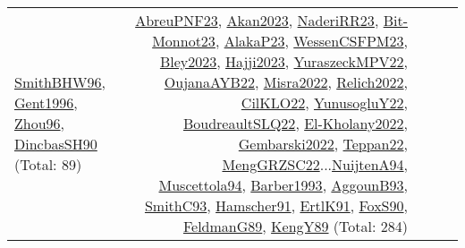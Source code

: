 {\begin{longtable}{p{3cm}r>{\raggedright\arraybackslash}p{6cm}>{\raggedright\arraybackslash}p{6cm}>{\raggedright\arraybackslash}p{8cm}}
\hyperref[detail:SmithBHW96]{SmithBHW96}, \hyperref[detail:Gent1996]{Gent1996}, \hyperref[detail:Zhou96]{Zhou96}, \hyperref[detail:DincbasSH90]{DincbasSH90} (Total: 89) & \hyperref[detail:AbreuPNF23]{AbreuPNF23}, \hyperref[detail:Akan2023]{Akan2023}, \hyperref[detail:NaderiRR23]{NaderiRR23}, \hyperref[detail:Bit-Monnot23]{Bit-Monnot23}, \hyperref[detail:AlakaP23]{AlakaP23}, \hyperref[detail:WessenCSFPM23]{WessenCSFPM23}, \hyperref[detail:Bley2023]{Bley2023}, \hyperref[detail:Hajji2023]{Hajji2023}, \hyperref[detail:YuraszeckMPV22]{YuraszeckMPV22}, \hyperref[detail:OujanaAYB22]{OujanaAYB22}, \hyperref[detail:Misra2022]{Misra2022}, \hyperref[detail:Relich2022]{Relich2022}, \hyperref[detail:CilKLO22]{CilKLO22}, \hyperref[detail:YunusogluY22]{YunusogluY22}, \hyperref[detail:BoudreaultSLQ22]{BoudreaultSLQ22}, \hyperref[detail:El-Kholany2022]{El-Kholany2022}, \hyperref[detail:Gembarski2022]{Gembarski2022}, \hyperref[detail:Teppan22]{Teppan22}, \hyperref[detail:MengGRZSC22]{MengGRZSC22}...\hyperref[detail:NuijtenA94]{NuijtenA94}, \hyperref[detail:Muscettola94]{Muscettola94}, \hyperref[detail:Barber1993]{Barber1993}, \hyperref[detail:AggounB93]{AggounB93}, \hyperref[detail:SmithC93]{SmithC93}, \hyperref[detail:Hamscher91]{Hamscher91}, \hyperref[detail:ErtlK91]{ErtlK91}, \hyperref[detail:FoxS90]{FoxS90}, \hyperref[detail:FeldmanG89]{FeldmanG89}, \hyperref[detail:KengY89]{KengY89} (Total: 284)\\

\end{longtable}}
